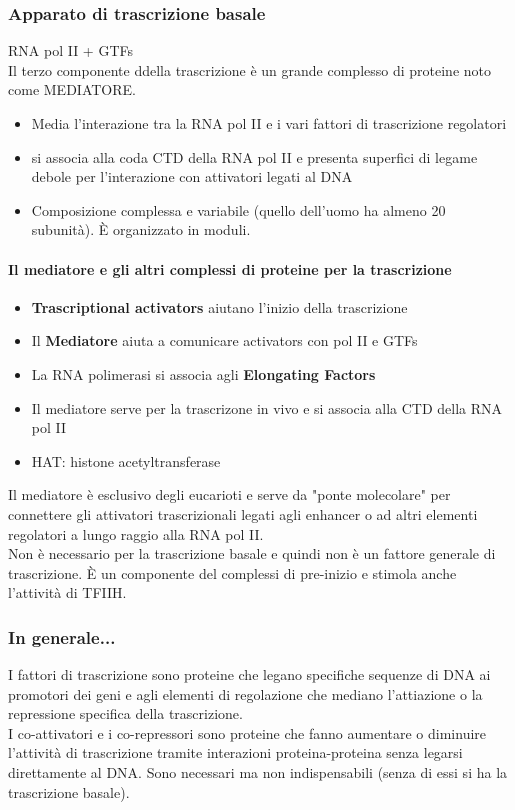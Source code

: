 \documentclass{article}
\begin{document}
\subsubsection{Apparato di trascrizione basale}
RNA pol II + GTFs\\
Il terzo componente ddella trascrizione è un grande complesso di proteine noto come MEDIATORE.
\begin{itemize}
    \item Media l'interazione tra la RNA pol II e i vari fattori di trascrizione regolatori
    \item si associa alla coda CTD della RNA pol II e presenta superfici di legame debole per l'interazione con attivatori legati al DNA
    \item Composizione complessa e variabile (quello dell'uomo ha almeno 20 subunità). È organizzato in moduli.
\end{itemize}
\paragraph{Il mediatore e gli altri complessi di proteine per la trascrizione}
\begin{itemize}
    \item \textbf{Trascriptional activators} aiutano l'inizio della trascrizione
    \item Il \textbf{Mediatore} aiuta a comunicare activators con pol II e GTFs
    \item La RNA polimerasi si associa agli \textbf{Elongating Factors}
    \item Il mediatore serve per la trascrizone in vivo e si associa alla CTD della RNA pol II
    \item HAT: histone acetyltransferase
\end{itemize}
Il mediatore è esclusivo degli eucarioti e serve da "ponte molecolare" per connettere gli attivatori trascrizionali legati agli enhancer o ad altri elementi regolatori a lungo raggio alla RNA pol II.\\
Non è necessario per la trascrizione basale e quindi non è un fattore generale di trascrizione. È un componente del complessi di pre-inizio e stimola anche l'attività di TFIIH.
\subsubsection{In generale...}
I fattori di trascrizione sono proteine che legano specifiche sequenze di DNA ai promotori dei geni e agli elementi di regolazione che mediano l'attiazione o la repressione specifica della trascrizione.\\
I co-attivatori e i co-repressori sono proteine che fanno aumentare o diminuire l'attività di trascrizione tramite interazioni proteina-proteina senza legarsi direttamente al DNA.
Sono necessari ma non indispensabili (senza di essi si ha la trascrizione basale).
\end{document}
